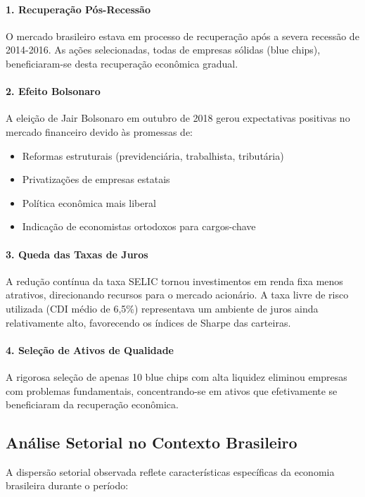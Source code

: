 \paragraph{1. Recuperação Pós-Recessão}
O mercado brasileiro estava em processo de recuperação após a severa recessão de 2014-2016. As ações selecionadas, todas de empresas sólidas (blue chips), beneficiaram-se desta recuperação econômica gradual.

\paragraph{2. Efeito Bolsonaro}
A eleição de Jair Bolsonaro em outubro de 2018 gerou expectativas positivas no mercado financeiro devido às promessas de:
\begin{itemize}
    \item Reformas estruturais (previdenciária, trabalhista, tributária)
    \item Privatizações de empresas estatais
    \item Política econômica mais liberal
    \item Indicação de economistas ortodoxos para cargos-chave
\end{itemize}

\paragraph{3. Queda das Taxas de Juros}
A redução contínua da taxa SELIC tornou investimentos em renda fixa menos atrativos, direcionando recursos para o mercado acionário. A taxa livre de risco utilizada (CDI médio de 6,5\%) representava um ambiente de juros ainda relativamente alto, favorecendo os índices de Sharpe das carteiras.

\paragraph{4. Seleção de Ativos de Qualidade}
A rigorosa seleção de apenas 10 blue chips com alta liquidez eliminou empresas com problemas fundamentais, concentrando-se em ativos que efetivamente se beneficiaram da recuperação econômica.

\subsection{Análise Setorial no Contexto Brasileiro}

A dispersão setorial observada reflete características específicas da economia brasileira durante o período:

